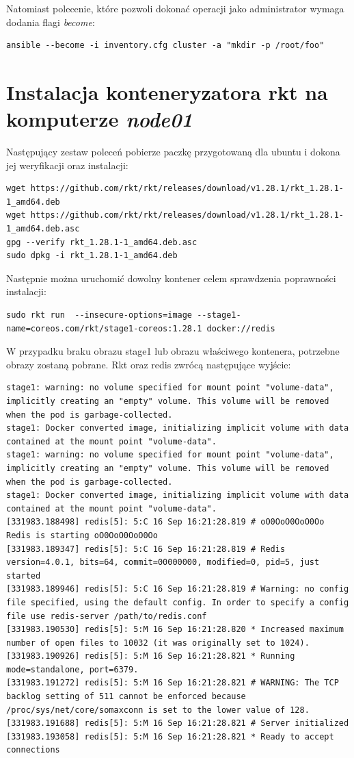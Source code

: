 \documentclass[10pt,a4paper,titlepage,twoside]{report}
\begin{document}
Natomiast polecenie, które pozwoli dokonać operacji jako administrator wymaga dodania flagi \textit{become}:
\begin{lstlisting}
ansible --become -i inventory.cfg cluster -a "mkdir -p /root/foo"
\end{lstlisting}

\section{Instalacja konteneryzatora rkt na komputerze \textit{node01}}

Następujący zestaw poleceń pobierze paczkę przygotowaną dla ubuntu i dokona jej weryfikacji oraz instalacji:
\begin{lstlisting}
wget https://github.com/rkt/rkt/releases/download/v1.28.1/rkt_1.28.1-1_amd64.deb
wget https://github.com/rkt/rkt/releases/download/v1.28.1/rkt_1.28.1-1_amd64.deb.asc
gpg --verify rkt_1.28.1-1_amd64.deb.asc
sudo dpkg -i rkt_1.28.1-1_amd64.deb
\end{lstlisting}

Następnie można uruchomić dowolny kontener celem sprawdzenia poprawności instalacji:
\begin{lstlisting}[breaklines=true]
sudo rkt run  --insecure-options=image --stage1-name=coreos.com/rkt/stage1-coreos:1.28.1 docker://redis
\end{lstlisting}

W przypadku braku obrazu stage1 lub obrazu właściwego kontenera, potrzebne obrazy zostaną pobrane. Rkt oraz redis zwrócą następujące wyjście:
\begin{lstlisting}[breaklines=true]
stage1: warning: no volume specified for mount point "volume-data", implicitly creating an "empty" volume. This volume will be removed when the pod is garbage-collected.
stage1: Docker converted image, initializing implicit volume with data contained at the mount point "volume-data".
stage1: warning: no volume specified for mount point "volume-data", implicitly creating an "empty" volume. This volume will be removed when the pod is garbage-collected.
stage1: Docker converted image, initializing implicit volume with data contained at the mount point "volume-data".
[331983.188498] redis[5]: 5:C 16 Sep 16:21:28.819 # oO0OoO0OoO0Oo Redis is starting oO0OoO0OoO0Oo
[331983.189347] redis[5]: 5:C 16 Sep 16:21:28.819 # Redis version=4.0.1, bits=64, commit=00000000, modified=0, pid=5, just started
[331983.189946] redis[5]: 5:C 16 Sep 16:21:28.819 # Warning: no config file specified, using the default config. In order to specify a config file use redis-server /path/to/redis.conf
[331983.190530] redis[5]: 5:M 16 Sep 16:21:28.820 * Increased maximum number of open files to 10032 (it was originally set to 1024).
[331983.190926] redis[5]: 5:M 16 Sep 16:21:28.821 * Running mode=standalone, port=6379.
[331983.191272] redis[5]: 5:M 16 Sep 16:21:28.821 # WARNING: The TCP backlog setting of 511 cannot be enforced because /proc/sys/net/core/somaxconn is set to the lower value of 128.
[331983.191688] redis[5]: 5:M 16 Sep 16:21:28.821 # Server initialized
[331983.193058] redis[5]: 5:M 16 Sep 16:21:28.821 * Ready to accept connections
\end{lstlisting}
\end{document}
